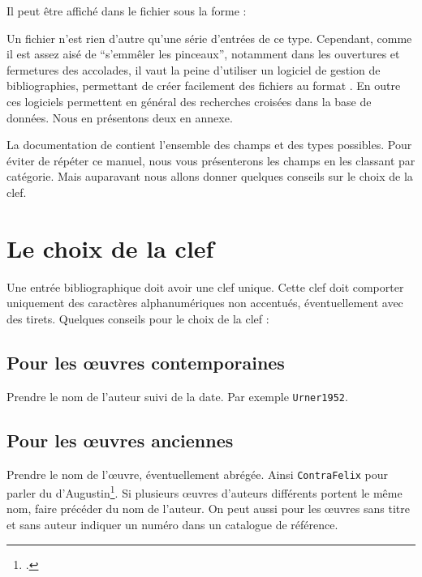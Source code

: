 Il peut être affiché dans le fichier  sous la forme :

\begin{quotation}
\cite{Urner1952}
\end{quotation}



Un fichier  n'est rien d'autre qu'une série d'entrées de ce type. Cependant, comme il est assez aisé de \enquote{s'emmêler les pinceaux}, notamment dans les ouvertures et fermetures des accolades, il vaut la peine d'utiliser un logiciel de gestion de bibliographies, permettant de créer facilement des fichiers au format . En outre ces logiciels permettent en général des recherches croisées dans la base de données. Nous en  présentons deux en annexe.

La documentation de  contient l'ensemble des champs et des types possibles. Pour éviter de répéter ce manuel, nous vous présenterons les champs en les classant par catégorie. Mais auparavant nous allons donner quelques conseils sur le choix de la clef.

\section{Le choix de la clef}

Une entrée bibliographique doit avoir une clef unique. Cette clef doit comporter uniquement des caractères alphanumériques non accentués, éventuellement avec des tirets. 
Quelques conseils pour le choix de la clef :
\subsection{Pour les œuvres contemporaines}
Prendre le nom de l'auteur suivi de la date. Par exemple \verb|Urner1952|.

\subsection{Pour les œuvres anciennes}

Prendre le nom de l'œuvre,  éventuellement abrégée. Ainsi \verb|ContraFelix| pour parler du  d'Augustin\footcite{ContraFelix}. Si plusieurs œuvres d'auteurs différents portent le même nom, faire précéder du nom de l'auteur. On peut aussi pour les œuvres sans titre et sans auteur indiquer un numéro dans un catalogue de référence.



